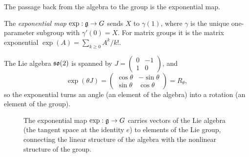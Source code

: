 The passage back from the algebra to the group is the exponential map.

\begin{definition}
\label{def:found:exp}
The \emph{exponential map} $\exp : \mathfrak{g} \to G$ sends $X$ to $\gamma(1)$, where
$\gamma$ is the unique one-parameter subgroup with $\gamma'(0) = X$. For matrix
groups it is the matrix exponential $\exp(A) = \sum_{k\ge 0} A^k/k!$.
\end{definition}

\begin{example}
\label{ex:found:exp-so2}
The Lie algebra $\mathfrak{so}(2)$ is spanned by
$J = \left(\begin{smallmatrix}0 & -1\\ 1 & 0\end{smallmatrix}\right)$, and
\[
  \exp(\theta J) = \begin{pmatrix}\cos\theta & -\sin\theta\\
  \sin\theta & \cos\theta\end{pmatrix} = R_\theta,
\]
so the exponential turns an angle (an element of the algebra) into a rotation (an
element of the group).
\end{example}

\begin{figure}[h]
\centering
{}
\caption[Exponential map]{The exponential map $\exp : \mathfrak{g} \to G$ carries
vectors of the Lie algebra (the tangent space at the identity $e$) to elements of
the Lie group, connecting the linear structure of the algebra with the nonlinear
structure of the group.}
\label{fig:found:exp}
\end{figure}


